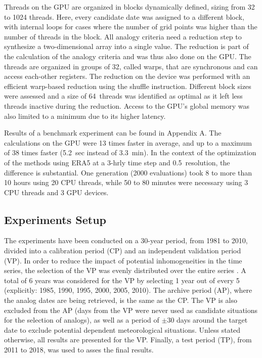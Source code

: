 \documentclass[draft]{agujournal2019}
\begin{document}
Threads on the GPU are organized in blocks dynamically defined, sizing from 32 to 1024 threads. Here, every candidate date was assigned to a different block, with internal loops for cases where the number of grid points was higher than the number of threads in the block. All analogy criteria need a reduction step to synthesize a two-dimensional array into a single value. The reduction is part of the calculation of the analogy criteria and was thus also done on the GPU. The threads are organized in groups of 32, called warps, that are synchronous and can access each-other registers. The reduction on the device was performed with an efficient warp-based reduction using the shuffle instruction. Different block sizes were assessed and a size of 64~threads was identified as optimal as it left less threads inactive during the reduction. Access to the GPU's global memory was also limited to a minimum due to its higher latency.

Results of a benchmark experiment can be found in Appendix A. The calculations on the GPU were 13 times faster in average, and up to a maximum of 38 times faster (5.2~sec instead of 3.3~min). In the context of the optimization of the methods using ERA5 at a 3-hrly time step and 0.5\degree\ resolution, the difference is substantial. One generation (2000 evaluations) took 8 to more than 10 hours using 20 CPU threads, while 50 to 80 minutes were necessary using 3 CPU threads and 3 GPU devices.


\subsection{Experiments Setup}
\label{setup}

The experiments have been conducted on a 30-year period, from 1981 to 2010, divided into a calibration period (CP) and an independent validation period (VP). In order to reduce the impact of potential inhomogeneities in the time series, the selection of the VP was evenly distributed over the entire series \cite<as in>[]{BenDaoud2010}. A total of 6 years was considered for the VP by selecting 1 year out of every 5 (explicitly: 1985, 1990, 1995, 2000, 2005, 2010). The archive period (AP), where the analog dates are being retrieved, is the same as the CP. The VP is also excluded from the AP (days from the VP were never used as candidate situations for the selection of analogs), as well as a period of $\pm30$ days around the target date to exclude potential dependent meteorological situations. Unless stated otherwise, all results are presented for the VP. Finally, a test period (TP), from 2011 to 2018, was used to asses the final results. 
\end{document}
